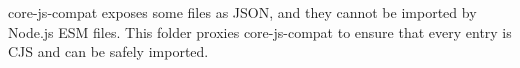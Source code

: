 {\ttfamily core-\/js-\/compat} exposes some files as JSON, and they cannot be imported by Node.\+js ESM files. This folder proxies {\ttfamily core-\/js-\/compat} to ensure that every entry is CJS and can be safely imported. 